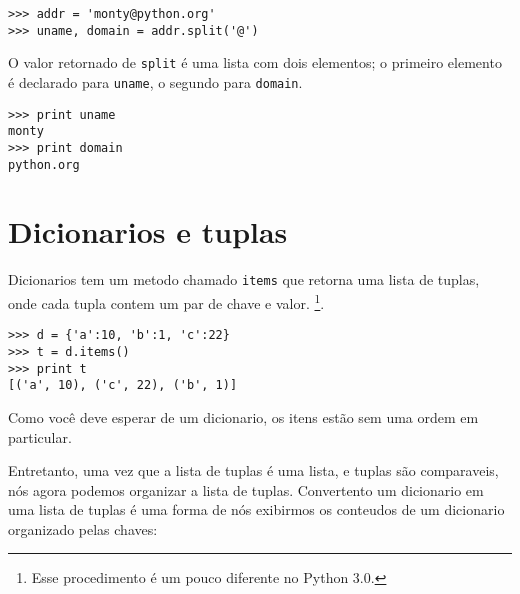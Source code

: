 
\beforeverb
\begin{verbatim}
>>> addr = 'monty@python.org'
>>> uname, domain = addr.split('@')
\end{verbatim}
\afterverb
%
O valor retornado de {\tt split} é uma lista com dois elementos;
o primeiro elemento é declarado para {\tt uname}, o segundo para
{\tt domain}.

\beforeverb
\begin{verbatim}
>>> print uname
monty
>>> print domain
python.org
\end{verbatim}
\afterverb
%

\section{Dicionarios e tuplas}


Dicionarios tem um metodo chamado {\tt items} que retorna uma lista de
tuplas, onde cada tupla contem um par de chave e valor.
\footnote{Esse procedimento é um pouco diferente no Python 3.0.}.

\beforeverb
\begin{verbatim}
>>> d = {'a':10, 'b':1, 'c':22}
>>> t = d.items()
>>> print t
[('a', 10), ('c', 22), ('b', 1)]
\end{verbatim}
\afterverb
%
Como você deve esperar de um dicionario, os itens estão sem
uma ordem em particular.

Entretanto, uma vez que a lista de tuplas é uma lista, e tuplas são comparaveis,
nós agora podemos organizar a lista de tuplas. Convertento um dicionario
em uma lista de tuplas é uma forma de nós exibirmos os conteudos de um
dicionario organizado pelas chaves:

